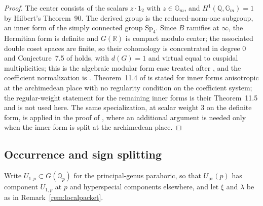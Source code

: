 \documentclass[10pt,a4paper]{amsart}
\newcommand{\Q}{\mathbb{Q}}
\newcommand{\R}{\mathbb{R}}
\newcommand{\Sp}{\mathrm{Sp}}
\newcommand{\Upr}{U_{\mathrm{pr}}}
\providecommand{\Upr}{U_{\mathrm{pr}}}
\begin{document}
	\begin{proof}
		The center consists of the scalars $z\cdot1_2$ with
		$z\in\mathbb{G}_m$, and $H^1(\Q,\mathbb{G}_m)=1$ by Hilbert's
		Theorem~90. The derived group is the reduced-norm-one subgroup, an
		inner form of the simply connected group $\Sp_4$. Since $B$ ramifies
		at $\infty$, the Hermitian form is definite and $G(\R)$ is compact
		modulo center; the associated double coset spaces are finite, so
		their cohomology is concentrated in degree $0$ and Conjecture~7.5 of
		\cite{RoesnerWeissauer2021} holds, with $d(G)=1$ and virtual equal
		to cuspidal multiplicities; this is the algebraic modular form case
		treated after \cite[Cor.~7.4]{RoesnerWeissauer2021}, and the
		coefficient normalization is \cite[Lem.~9.1,
		Prop.~9.2]{RoesnerWeissauer2021}. Theorem~11.4 of
		\cite{RoesnerWeissauer2021} is stated for inner forms anisotropic at
		the archimedean place with no regularity condition on the
		coefficient system; the regular-weight statement for the remaining
		inner forms is their Theorem~11.5 and is not used here. The same
		specialization, at scalar weight $3$ on the definite form, is
		applied in the proof of \cite[Prop.~12.3]{RoesnerWeissauer2021},
		where an additional argument is needed only when the inner form is
		split at the archimedean place.
	\end{proof}
	
	\subsection{Occurrence and sign splitting}
	\label{ss:occurrence-theorem}
	
	Write $U_{1,p}\subset G(\Q_p)$ for the principal-genus parahoric, so
	that $\Upr(p)$ has component $U_{1,p}$ at $p$ and hyperspecial
	components elsewhere, and let $\xi$ and $\lambda$ be as in
	Remark~\ref{rem:localpacket}.
	
\end{document}
